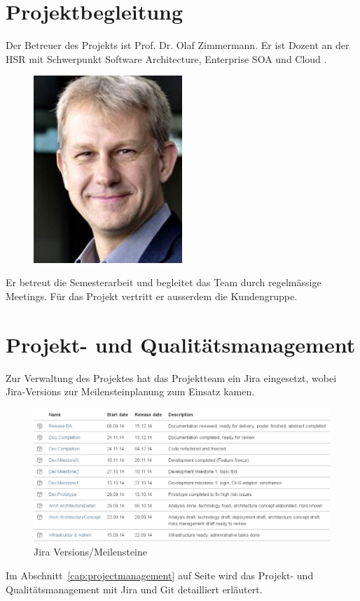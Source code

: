 	\section{Projektbegleitung}
	Der Betreuer des Projekts ist Prof. Dr. Olaf Zimmermann.
	Er ist Dozent an der HSR mit Schwerpunkt Software Architecture, Enterprise SOA und Cloud \cite{zimmermann_ifs_2014}.
	\begin{figure}[H]
		\begin{minipage}[b]{0.5\linewidth}
			\includegraphics[width=0.5\textwidth]{projectPlan/media/img/ozimmermann.jpg}
			\centering
			\caption{\teacher}
			\label{fig:olafzimmermann}
		\end{minipage}
	\end{figure}
	Er betreut die Semesterarbeit und begleitet das Team durch regelmässige Meetings.
	Für das Projekt vertritt er ausserdem die Kundengruppe.


	\section{Projekt- und Qualitätsmanagement}
		Zur Verwaltung des Projektes hat das Projektteam ein Jira eingesetzt,
		wobei Jira-Versions zur Meilensteinplanung zum Einsatz kamen.
		
		\begin{figure}[H]
			\includegraphics[width=\textwidth]{projectPlan/media/img/jiraVersions.jpg}
			\centering
			\caption{Jira Versions/Meilensteine}
			\label{fig:jiraVersions}
		\end{figure}
		
		Im Abschnitt~\ref{cap:projectmanagement} auf Seite \pageref{cap:projectmanagement} wird das Projekt- und Qualitätsmanagement mit Jira und Git detailliert erläutert.
	
